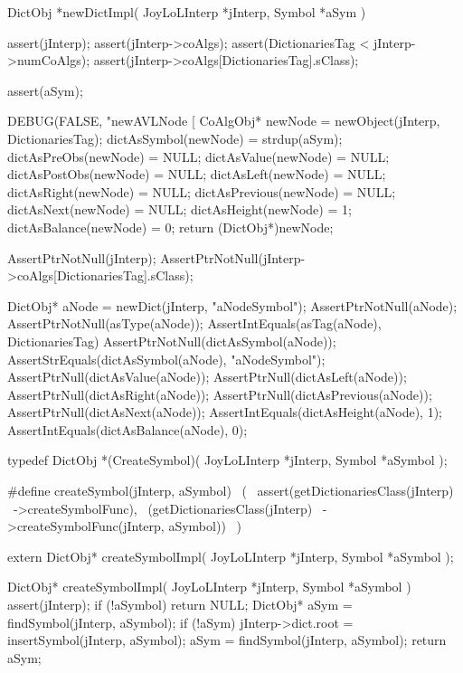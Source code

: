 DictObj *newDictImpl(
  JoyLoLInterp *jInterp,
  Symbol *aSym
) {
  assert(jInterp);
  assert(jInterp->coAlgs);
  assert(DictionariesTag < jInterp->numCoAlgs);
  assert(jInterp->coAlgs[DictionariesTag].sClass);
  
  assert(aSym);
  
  DEBUG(FALSE, "newAVLNode [%
  CoAlgObj* newNode   = newObject(jInterp, DictionariesTag);
  dictAsSymbol(newNode)   = strdup(aSym);
  dictAsPreObs(newNode)   = NULL;
  dictAsValue(newNode)    = NULL;
  dictAsPostObs(newNode)  = NULL;
  dictAsLeft(newNode)     = NULL;
  dictAsRight(newNode)    = NULL;
  dictAsPrevious(newNode) = NULL;
  dictAsNext(newNode)     = NULL;
  dictAsHeight(newNode)   = 1;
  dictAsBalance(newNode)  = 0;
  return (DictObj*)newNode;
}
\stopCCode


\startCTest
  AssertPtrNotNull(jInterp);
  AssertPtrNotNull(jInterp->coAlgs[DictionariesTag].sClass);

  DictObj* aNode = newDict(jInterp, "aNodeSymbol");
  AssertPtrNotNull(aNode);
  AssertPtrNotNull(asType(aNode));
  AssertIntEquals(asTag(aNode), DictionariesTag)
  AssertPtrNotNull(dictAsSymbol(aNode));
  AssertStrEquals(dictAsSymbol(aNode), "aNodeSymbol");
  AssertPtrNull(dictAsValue(aNode));
  AssertPtrNull(dictAsLeft(aNode));
  AssertPtrNull(dictAsRight(aNode));
  AssertPtrNull(dictAsPrevious(aNode));
  AssertPtrNull(dictAsNext(aNode));
  AssertIntEquals(dictAsHeight(aNode), 1);
  AssertIntEquals(dictAsBalance(aNode), 0);
\stopCTest
\stopTestCase
\stopTestSuite

\startTestSuite[createSymbol]

\startCHeader
typedef DictObj *(CreateSymbol)(
  JoyLoLInterp *jInterp,
  Symbol       *aSymbol
);

#define createSymbol(jInterp, aSymbol)      \
  (                                         \
    assert(getDictionariesClass(jInterp)    \
      ->createSymbolFunc),                  \
    (getDictionariesClass(jInterp)          \
      ->createSymbolFunc(jInterp, aSymbol)) \
  )
\stopCHeader

\setCHeaderStream{private}
\startCHeader
extern DictObj* createSymbolImpl(
  JoyLoLInterp *jInterp,
  Symbol       *aSymbol
);
\stopCHeader
{}

\startCCode
DictObj* createSymbolImpl(
  JoyLoLInterp *jInterp,
  Symbol       *aSymbol
) {
  assert(jInterp);
  if (!aSymbol) return NULL;
  DictObj* aSym = findSymbol(jInterp, aSymbol);
  if (!aSym) {
    jInterp->dict.root = insertSymbol(jInterp, aSymbol);
    aSym = findSymbol(jInterp, aSymbol);
  }
  return aSym;
}
\stopCCode
\stopTestSuite


